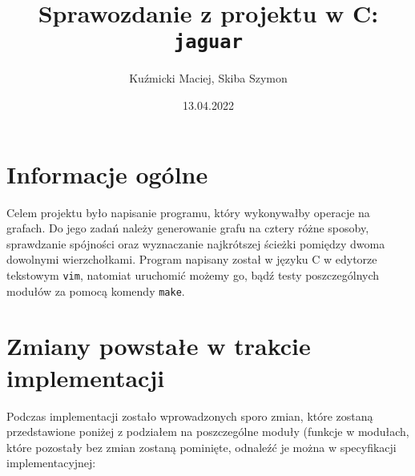 \documentclass[]{article}
\title{Sprawozdanie z projektu w C: \texttt{jaguar}}
\author{Kuźmicki Maciej, Skiba Szymon}
\date{13.04.2022}
\begin{document}
\maketitle
\thispagestyle{fancy}
\section{Informacje ogólne}\label{header-n231}
Celem projektu było napisanie programu, który wykonywałby operacje na grafach. Do jego zadań należy generowanie grafu na cztery różne sposoby, sprawdzanie spójności oraz wyznaczanie najkrótszej ścieżki pomiędzy dwoma dowolnymi wierzchołkami. Program napisany został w języku C w edytorze tekstowym \texttt{vim}, natomiat uruchomić możemy go, bądź testy poszczególnych modułów za pomocą komendy \texttt{make}.


\section{Zmiany powstałe w trakcie implementacji}\label{header-n233}
 Podczas implementacji zostało wprowadzonych sporo zmian, które zostaną przedstawione poniżej z podziałem na poszczególne moduły (funkcje w modułach, które pozostały bez zmian zostaną pominięte, odnaleźć je można w specyfikacji implementacyjnej:
\end{document}
